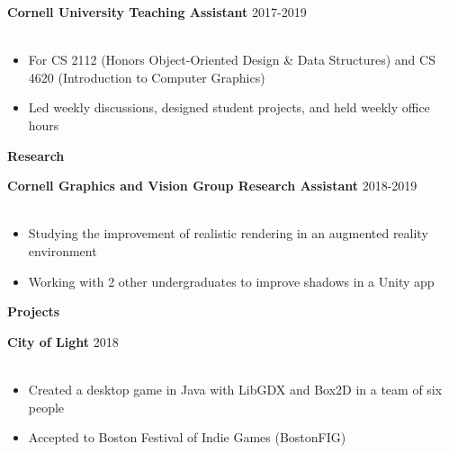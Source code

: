 \documentclass[12pt]{article}
\newcommand{\group}[1]{
	\fontsize{14}{0} \selectfont
	\textbf{#1}
}
\newcommand{\jobCaption}[2]{
	\hspace{0.3em}
	\fontsize{12}{13} \selectfont
	\textbf{#1}
	\fontsize{11}{12} \selectfont 
	\hfill{#2}\\[.1em]
}
\begin{document}
	\jobCaption{Cornell University Teaching Assistant}{2017-2019}\\[-1.75em]
	\begin{itemize}[leftmargin=1.5cm]
		\setlength\itemsep{-.25em}
		\fontsize{11}{0} \selectfont 
	
		\item For CS 2112 (Honors Object-Oriented Design \& Data Structures) and CS 4620 (Introduction to Computer Graphics)
		\item Led weekly discussions, designed student projects, and held weekly office hours
	\end{itemize}
	\vspace{1em}

\group{Research}
	\vspace{.4em}
	
	\jobCaption{Cornell Graphics and Vision Group Research Assistant}{2018-2019}\\[-1.75em]
	\begin{itemize}[leftmargin=1.5cm]
		\setlength\itemsep{-.25em}
		\fontsize{11}{0} \selectfont 
	\item Studying the improvement of realistic rendering in an augmented reality environment
	\item Working with 2 other undergraduates to improve shadows in a Unity app
	\end{itemize}
	
\begin{comment}
	\vspace{0.7em}

	\jobCaption{Cornell Learning Analytics Research Assistant}{2016-2018}\\[-1.75em]
	\begin{itemize}[leftmargin=1.5cm]
		\setlength\itemsep{-.25em}
		\fontsize{11}{0} \selectfont 
	\item Used R for exploratory analysis on available student data
	\item Identified key differences between taking co-requisite courses as pre-requisites
	
	\end{itemize}
\end{comment}

	\vspace{1em}

\group{Projects}
	\vspace{.4em}
	
	
\jobCaption{City of Light}{2018}\\[-1.75em]
	\begin{itemize}[leftmargin=1.5cm]
		\setlength\itemsep{-.25em}
		\fontsize{11}{0} \selectfont 
		\item Created a desktop game in Java with LibGDX and Box2D in a team of six people
		\item Accepted to Boston Festival of Indie Games (BostonFIG)
		
	\end{itemize}
\end{document}
